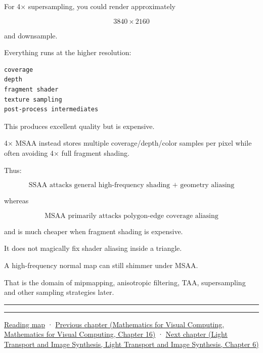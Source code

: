 For 4× supersampling, you could render approximately

\[
3840\times2160
\]

and downsample.

Everything runs at the higher resolution:

\begin{verbatim}
coverage
depth
fragment shader
texture sampling
post-process intermediates
\end{verbatim}

This produces excellent quality but is expensive.

4× MSAA instead stores multiple coverage/depth/color samples per pixel while often avoiding 4× full fragment shading.

Thus:

\[
\boxed{
\text{SSAA attacks general high-frequency shading + geometry aliasing}
}
\]

whereas

\[
\boxed{
\text{MSAA primarily attacks polygon-edge coverage aliasing}
}
\]

and is much cheaper when fragment shading is expensive.

It does not magically fix shader aliasing inside a triangle.

A high-frequency normal map can still shimmer under MSAA.

That is the domain of mipmapping, anisotropic filtering, TAA, supersampling and other sampling strategies later.

\begin{center}\rule{0.5\linewidth}{0.5pt}\end{center}

\begin{center}\rule{0.5\linewidth}{0.5pt}\end{center}

\hyperref[volume-reading-map]{Reading map} · \href{../02-Mathematics-for-Visual-Computing/main.pdf\#nameddest=03-visual-computing-i-ch012-probability-statistics-and-uncertainty}{Previous chapter (Mathematics for Visual Computing, Mathematics for Visual Computing, Chapter 16)} · \href{../04-Light-Transport-and-Image-Synthesis/main.pdf\#nameddest=03-visual-computing-i-ch014-transparency-blending-and-visibility}{Next chapter (Light Transport and Image Synthesis, Light Transport and Image Synthesis, Chapter 6)}
